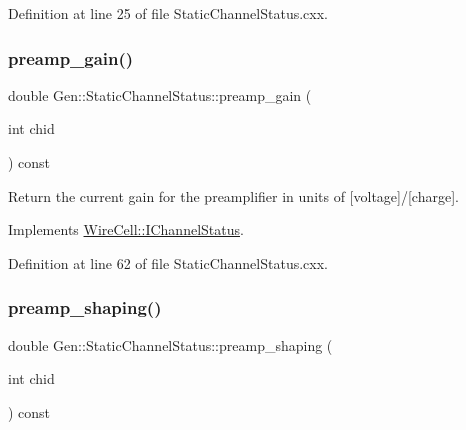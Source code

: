 Definition at line 25 of file Static\+Channel\+Status.\+cxx.

\mbox{\label{class_wire_cell_1_1_gen_1_1_static_channel_status_a7a43a5c1f263a985a705b24669b8cda1}} 
\subsubsection{\texorpdfstring{preamp\+\_\+gain()}{preamp\_gain()}}
{\footnotesize\ttfamily double Gen\+::\+Static\+Channel\+Status\+::preamp\+\_\+gain (\begin{DoxyParamCaption}\item[{int}]{chid }\end{DoxyParamCaption}) const\hspace{0.3cm}{\ttfamily [virtual]}}

Return the current gain for the preamplifier in units of \mbox{[}voltage\mbox{]}/\mbox{[}charge\mbox{]}. 

Implements \hyperlink{class_wire_cell_1_1_i_channel_status_ab9df0f4008fbdc708b7feea486da5c36}{Wire\+Cell\+::\+I\+Channel\+Status}.



Definition at line 62 of file Static\+Channel\+Status.\+cxx.

\mbox{\label{class_wire_cell_1_1_gen_1_1_static_channel_status_a8275297c1a7d034e3050827eaa8d6fb1}} 
\subsubsection{\texorpdfstring{preamp\+\_\+shaping()}{preamp\_shaping()}}
{\footnotesize\ttfamily double Gen\+::\+Static\+Channel\+Status\+::preamp\+\_\+shaping (\begin{DoxyParamCaption}\item[{int}]{chid }\end{DoxyParamCaption}) const\hspace{0.3cm}{\ttfamily [virtual]}}

